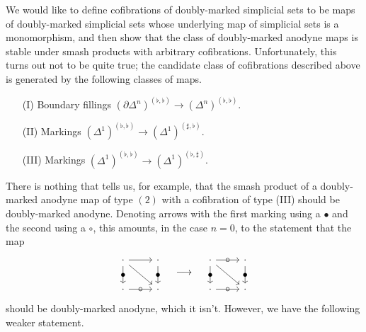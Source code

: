 \documentclass[main.tex]{subfiles}
\begin{document}
We would like to define cofibrations of doubly-marked simplicial sets to be maps of doubly-marked simplicial sets whose underlying map of simplicial sets is a monomorphism, and then show that the class of doubly-marked anodyne maps is stable under smash products with arbitrary cofibrations. Unfortunately, this turns out not to be quite true; the candidate class of cofibrations described above is generated by the following classes of maps.
\begin{itemize}
  \item[(I)] Boundary fillings $(\partial \Delta^{n})^{(\flat, \flat)} \to (\Delta^{n})^{(\flat, \flat)}$.

  \item[(II)] Markings $(\Delta^{1})^{(\flat, \flat)} \to (\Delta^{1})^{(\sharp, \flat)}$.

  \item[(III)] Markings $(\Delta^{1})^{(\flat, \flat)} \to (\Delta^{1})^{(\flat, \sharp)}$.
\end{itemize}
There is nothing that tells us, for example, that the smash product of a doubly-marked anodyne map of type $(2)$ with a cofibration of type (III) should be doubly-marked anodyne. Denoting arrows with the first marking using a $\bullet$ and the second using a $\circ$, this amounts, in the case $n = 0$, to the statement that the map
\begin{equation*}
  \begin{tikzcd}
    \cdot
    \arrow[r]
    \arrow[d, "\bullet" marking]
    \arrow[dr]
    & \cdot
    \arrow[d, "\bullet" marking]
    \\
    \cdot
    \arrow[r, "\circ" marking]
    & \cdot
  \end{tikzcd}
  \quad \longrightarrow \quad
  \begin{tikzcd}
    \cdot
    \arrow[r, "\circ" marking]
    \arrow[d, "\bullet" marking]
    \arrow[dr]
    & \cdot
    \arrow[d, "\bullet" marking]
    \\
    \cdot
    \arrow[r, "\circ" marking]
    & \cdot
  \end{tikzcd}
\end{equation*}
should be doubly-marked anodyne, which it isn't. However, we have the following weaker statement.
\end{document}
